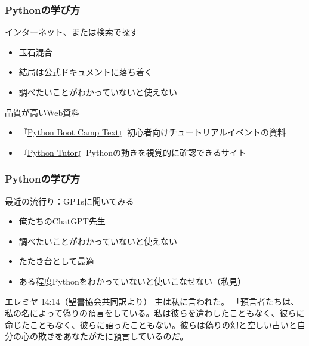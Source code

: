 \documentclass[aspectratio=169,dvipdfmx,12pt,notheorems]{beamer}
\theoremstyle{definition}
\begin{document}
\begin{frame}\frametitle{Pythonの学び方}

\begin{block}{インターネット、または検索で探す}
\begin{itemize}
\item 玉石混合
\item 結局は公式ドキュメントに落ち着く
\item 調べたいことがわかっていないと使えない
\end{itemize}
\end{block}

\begin{exampleblock}{品質が高いWeb資料}
\begin{itemize}
\item 『\href{https://pycamp.pycon.jp/textbook/index.html}{Python Boot Camp Text}』初心者向けチュートリアルイベントの資料
\item 『\href{https://pythontutor.com/}{Python Tutor}』Pythonの動きを視覚的に確認できるサイト
\end{itemize}
\end{exampleblock}

\end{frame}

\begin{frame}\frametitle{Pythonの学び方}

\begin{block}{最近の流行り：GPTsに聞いてみる}
\begin{itemize}
\item 俺たちのChatGPT先生
\item 調べたいことがわかっていないと使えない
\item たたき台として最適
\item ある程度Pythonをわかっていないと使いこなせない（私見）
\end{itemize}
\end{block}

\begin{exampleblock}{エレミヤ 14:14（聖書協会共同訳より）}
主は私に言われた。
「預言者たちは、私の名によって偽りの預言をしている。私は彼らを遣わしたこともなく、彼らに命じたこともなく、彼らに語ったこともない。彼らは偽りの幻と空しい占いと自分の心の欺きをあなたがたに預言しているのだ。
\end{exampleblock}

\end{frame}
\end{document}

